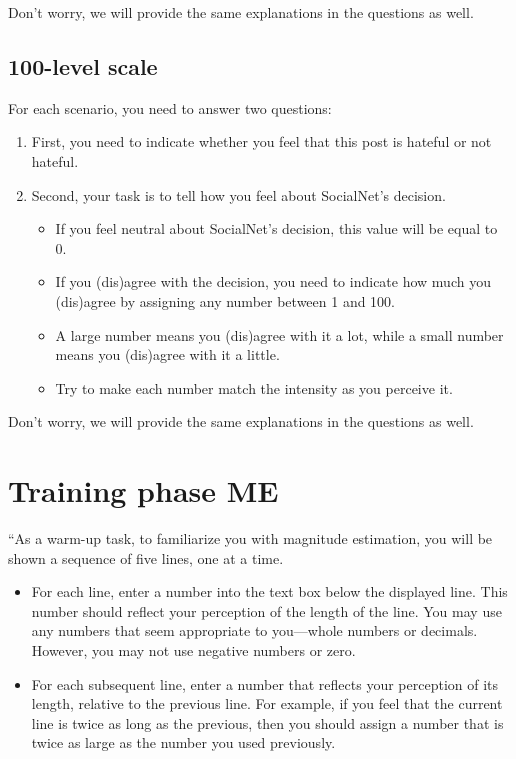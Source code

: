\begin{flushleft}
    Don't worry, we will provide the same explanations in the questions as well.
\end{flushleft}

\subsection{100-level scale}
For each scenario, you need to answer two questions:
\begin{enumerate}
    \item First, you need to indicate whether you feel that this post is hateful or not hateful.
    \item Second, your task is to tell how you feel about SocialNet's decision.
          \begin{itemize}
              \item If you feel neutral about SocialNet's decision, this value will be equal to 0.
              \item If you (dis)agree with the decision, you need to indicate how much you (dis)agree by assigning any number between 1 and 100.
              \item A large number means you (dis)agree with it a lot, while a small number means you (dis)agree with it a little.
              \item Try to make each number match the intensity as you perceive it.
          \end{itemize}
\end{enumerate}

\begin{flushleft}
    Don't worry, we will provide the same explanations in the questions as well.
\end{flushleft}

\section{Training phase ME}
``As a warm-up task, to familiarize you with magnitude estimation, you will be shown a sequence of five lines, one at a time.
\begin{itemize}
    \item For each line, enter a number into the text box below the displayed line. This number should reflect your perception of the length of the line. You may use any numbers that seem appropriate to you—whole numbers or decimals. However, you may not use negative numbers or zero.
    \item For each subsequent line, enter a number that reflects your perception of its length, relative to the previous line. For example, if you feel that the current line is twice as long as the previous, then you should assign a number that is twice as large as the number you used previously.
\end{itemize}

